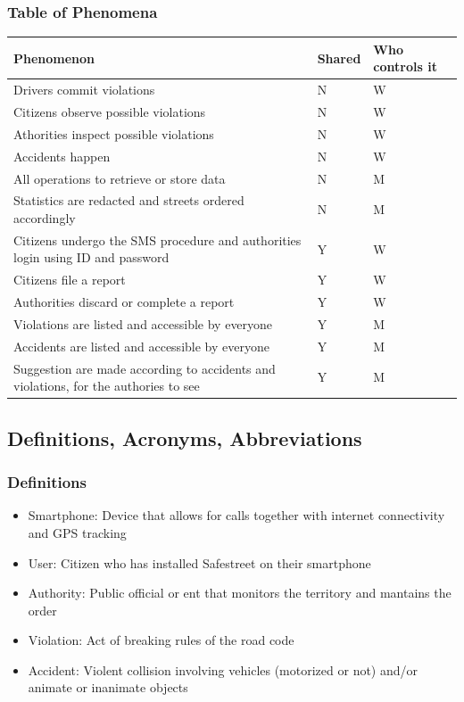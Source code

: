\subsubsection{Table of Phenomena}

\begin{tabular}{|l|l|l|}
\hline
    \textbf{Phenomenon} & \textbf{Shared} & \textbf{Who controls it} \\ \hline
    Drivers commit violations & N & W\\ \hline
    Citizens observe possible violations & N & W\\ \hline
    Athorities inspect possible violations & N & W\\ \hline
    Accidents happen & N & W\\ \hline
    All operations to retrieve or store data & N & M\\ \hline
    Statistics are redacted and streets ordered accordingly & N & M\\ \hline
    Citizens undergo the SMS procedure and authorities login using ID and password & Y & W\\ \hline
    Citizens file a report & Y & W\\ \hline
    Authorities discard or complete a report & Y & W\\ \hline
    Violations are listed and accessible by everyone& Y & M\\ \hline
    Accidents are listed and accessible by everyone& Y & M\\ \hline
    Suggestion are made according to accidents and violations, for the authories to see & Y & M\\
    \hline 
\end{tabular}

\subsection{Definitions, Acronyms, Abbreviations}

\subsubsection{Definitions}

\begin{itemize}
    \item Smartphone: Device that allows for calls together with internet 
    connectivity and GPS tracking
    \item User: Citizen who has installed Safestreet on their smartphone
    \item Authority: Public official or ent that monitors the territory 
    and mantains the order
    \item Violation: Act of breaking rules of the road code
    \item Accident: Violent collision involving vehicles 
    (motorized or not) and/or animate or inanimate objects 
\end{itemize}

